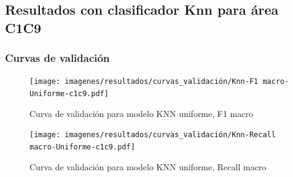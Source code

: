
\subsection{Resultados con clasificador Knn para área C1C9}

\subsubsection{Curvas de validación}

\begin{figure}[H]
	\centering
	\captionsetup{justification=centering}
	\texttt{[image: imagenes/resultados/curvas\_validación/Knn-F1 macro-Uniforme-c1c9.pdf]}
	\caption{Curva de validación para modelo KNN uniforme, F1 macro}
	\label{fig:res_knn_vc_f1_c1c9}
\end{figure}

\begin{figure}[H]
	\centering
	\captionsetup{justification=centering}
	\texttt{[image: imagenes/resultados/curvas\_validación/Knn-Recall macro-Uniforme-c1c9.pdf]}
	\caption{Curva de validación para modelo KNN uniforme, Recall macro}
	\label{fig:res_knn_vc_recall_c1c9}
\end{figure}

